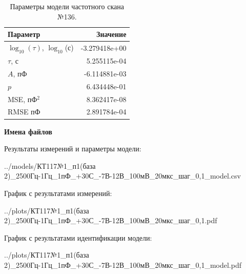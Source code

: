 \begin{table}[!ht]
    \centering
    \caption{Параметры модели частотного скана №136.}
    \begin{tabular}{|l|r|}
        \hline
        Параметр                                       & Значение                  \\ \hline
        $\log_{10}(\tau)$, $\log_{10}$(с)              & -3.279418e+00             \\ \hline
        $\tau$, с                                      & 5.255115e-04              \\ \hline
        $A$, пФ                                        & -6.114881e-03             \\ \hline
        $p$                                            & 6.434448e-01              \\ \hline
        MSE, пФ$^2$                                    & 8.362417e-08              \\ \hline
        RMSE пФ                                        & 2.891784e-04              \\ \hline
    \end{tabular}
    \label{table:frequency_scan_model_136}
\end{table}

\textbf{Имена файлов}

Результаты измерений и параметры модели:

\scriptsize../models/КТ117№1\_п1(база 2)\_2500Гц-1Гц\_1пФ\_+30С\_-7В-12В\_100мВ\_20мкс\_шаг\_0,1\_model.csv
\normalsize

График с результатами измерений:

\scriptsize../plots/КТ117№1\_п1(база 2)\_2500Гц-1Гц\_1пФ\_+30С\_-7В-12В\_100мВ\_20мкс\_шаг\_0,1.pdf
\normalsize

График с результатами идентификации модели:

\scriptsize../plots/КТ117№1\_п1(база 2)\_2500Гц-1Гц\_1пФ\_+30С\_-7В-12В\_100мВ\_20мкс\_шаг\_0,1\_model.pdf
\normalsize

